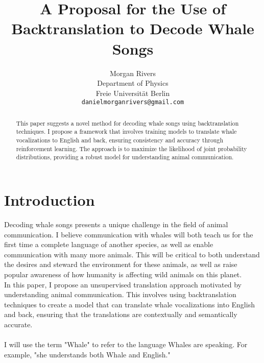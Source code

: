\documentclass{article}
\title{A Proposal for the Use of Backtranslation to Decode Whale Songs}
\author{Morgan Rivers \\
        Department of Physics \\
        Freie Universität Berlin \\    
        \texttt{danielmorganrivers@gmail.com}
}
\begin{document}
\maketitle

\begin{abstract}
This paper suggests a novel method for decoding whale songs using backtranslation techniques. I propose a framework that involves training models to translate whale vocalizations to English and back, ensuring consistency and accuracy through reinforcement learning. The approach is to maximize the likelihood of joint probability distributions, providing a robust model for understanding animal communication.
\end{abstract}

\section{Introduction}
Decoding whale songs presents a unique challenge in the field of animal communication. I believe communication with whales will both teach us for the first time a complete language of another species, as well as enable communication with many more animals. This will be critical to both understand the desires and steward the environment for these animals, as well as raise popular awareness of how humanity is affecting wild animals on this planet.\\
In this paper, I propose an unsupervised translation approach motivated by understanding animal communication. This involves using backtranslation techniques to create a model that can translate whale vocalizations into English and back, ensuring that the translations are contextually and semantically accurate.\\ \\
I will use the term "Whale" to refer to the language Whales are speaking. For example, "she understands both Whale and English."
\end{document}
